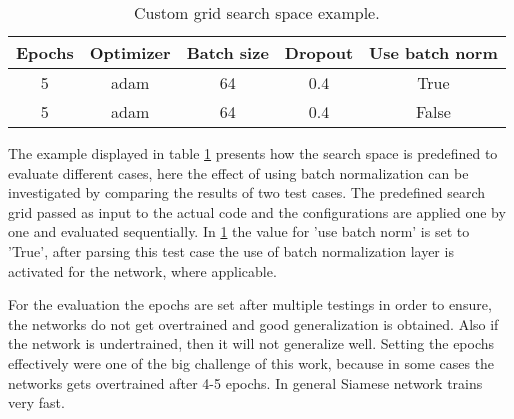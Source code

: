 \begin{table}
\centering
    \begin{tabular}{|c c c c c|} 
      \hline\hline
      Epochs & Optimizer & Batch size & Dropout & Use batch norm\\[0.5ex] 
      \hline
      5 & adam & 64 & 0.4 & True \\  
      \hline
      5 & adam & 64 & 0.4 & False \\ 
      \hline \hline
    \end{tabular}
  \caption{Custom grid search space example.}
  \label{table:grid_example}
\end{table}

The example displayed in table \ref{table:grid_example} presents how the search space is predefined to evaluate different cases, here the effect of using batch normalization can be investigated by comparing the results of two test cases.
The predefined search grid passed as input to the actual code and the configurations are applied one by one and evaluated sequentially. In \ref{table:grid_example} the value for 'use batch norm' is set to 'True', after parsing this test case the use of batch normalization layer is activated for the network, where applicable. 

For the evaluation the epochs are set after multiple testings in order to ensure, the networks do not get overtrained and good generalization is obtained. Also if the network is undertrained, then 
it will not generalize well. Setting the epochs effectively were one of the big challenge of this work, because in some cases the networks gets overtrained after 4-5 epochs. In general Siamese network trains very fast.


